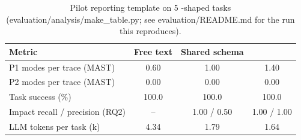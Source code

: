 \begin{table}[t]
\centering
\caption{Pilot reporting template on 5 \devteam{}-shaped tasks (evaluation/analysis/make_table.py; see evaluation/README.md for the run this reproduces).}
\label{tab:pilot}
\footnotesize
\setlength{\tabcolsep}{4pt}
\begin{tabular}{@{}lccc@{}}
\toprule
Metric & Free text & Shared schema & \tool{} \\
\midrule
P1 modes per trace (MAST) & 0.60 & 1.00 & 1.40 \\
P2 modes per trace (MAST) & 0.00 & 0.00 & 0.00 \\
Task success (\%) & 100.0 & 100.0 & 100.0 \\
Impact recall / precision (RQ2) & -- & 1.00 / 0.50 & 1.00 / 1.00 \\
LLM tokens per task (k) & 4.34 & 1.79 & 1.64 \\
\bottomrule
\end{tabular}
\end{table}
